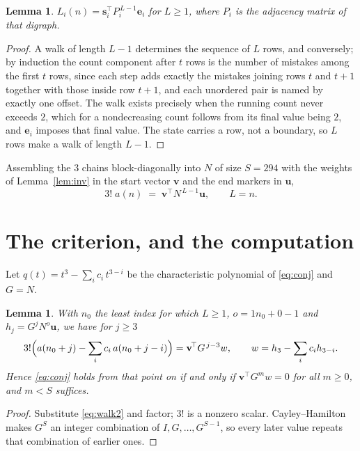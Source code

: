 \documentclass[11pt,a4paper]{article}
\theoremstyle{plain}
\newtheorem{lemma}[theorem]{Lemma}
\theoremstyle{definition}
\begin{document}
\begin{lemma}\label{lem:walk}
$L_i(n)=\mathbf{s}_i^{\!\top}P_i^{\,L-1}\mathbf{e}_i$ for $L\ge1$, where $P_i$ is the
adjacency matrix of that digraph.
\end{lemma}

\begin{proof}
A walk of length $L-1$ determines the sequence of $L$ rows, and conversely; by induction
the count component after $t$ rows is the number of mistakes among the first $t$ rows,
since each step adds exactly the mistakes joining rows $t$ and $t+1$ together with those
inside row $t+1$, and each unordered pair is named by exactly one offset. The walk exists
precisely when the running count never exceeds $2$, which for a nondecreasing count follows
from its final value being $2$, and $\mathbf{e}_i$ imposes that final value. The state
carries a row, not a boundary, so $L$ rows make a walk of length $L-1$.
\end{proof}

Assembling the $3$ chains block-diagonally into $N$ of size $S=294$ with the weights of
Lemma~\ref{lem:inv} in the start vector $\mathbf{v}$ and the end markers in
$\mathbf{u}$,
\begin{equation}\label{eq:walk2}
3!\;a(n)\;=\;\mathbf{v}^{\!\top}N^{\,L-1}\mathbf{u},\qquad L=n .
\end{equation}

\section{The criterion, and the computation}

Let $q(t)=t^{3}-\sum_i c_i\,t^{3-i}$ be the characteristic polynomial of
\eqref{eq:conj} and $G=N$.

\begin{lemma}\label{lem:crit}
With $n_0$ the least index for which $L\ge1$, $o=1n_0+0-1$ and
$h_j=G^{j}N^{o}\mathbf{u}$, we have for $j\ge3$
\[
3!\Bigl(a(n_0+j)-\sum_i c_i\,a(n_0+j-i)\Bigr)=\mathbf{v}^{\!\top}G^{\,j-3}w,
\qquad w=h_{3}-\sum_i c_ih_{3-i} .
\]
Hence \eqref{eq:conj} holds from that point on if and only if
$\mathbf{v}^{\!\top}G^{m}w=0$ for all $m\ge0$, and $m<S$ suffices.
\end{lemma}

\begin{proof}
Substitute \eqref{eq:walk2} and factor; $3!$ is a nonzero scalar. Cayley--Hamilton
makes $G^{S}$ an integer combination of $I,G,\dots,G^{S-1}$, so every later value repeats
that combination of earlier ones.
\end{proof}
\end{document}
